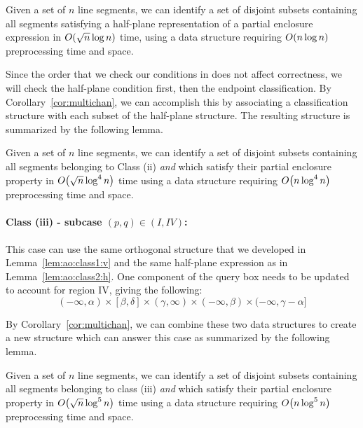 \begin{lemma}
\label{lem:ao:class2:h}
Given a set of $n$ line segments, we can identify a set of disjoint subsets 
containing all segments satisfying a half-plane representation of a partial 
enclosure expression in $O\!\left(\sqrt{n}\log{n}\right)$ time, using a data structure 
requiring $O\!\left(n\log{n}\right)$ preprocessing time and space.
\end{lemma}

Since the order that we check our conditions in does not affect correctness, we 
will check the half-plane condition first, then the endpoint classification.  
By Corollary~\ref{cor:multichan}, we can accomplish this by associating a 
classification structure with each subset of the half-plane structure. The 
resulting structure is summarized by the following lemma.

\begin{lemma}
\label{lem:ao:class2:c}
Given a set of $n$ line segments, we can identify a set of disjoint subsets 
containing all segments belonging to Class (ii) \emph{and} which satisfy their 
partial enclosure property in $O\!\left(\sqrt{n}\log^4{n}\right)$ time using a data 
structure requiring $O\!\left(n\log^4{n}\right)$ preprocessing time and space.
\end{lemma}


\paragraph{Class (iii) - subcase $(p, q) \in (I, IV)$:} 
This case can use the same orthogonal structure that we developed in 
Lemma~\ref{lem:ao:class1:v} and the same half-plane expression as in 
Lemma~\ref{lem:ao:class2:h}. 
One component of the query box needs to be updated to account for region IV, 
giving the following:
\[
(-\infty, \alpha) \times [\beta, \delta] \times (\gamma, \infty) \times 
(-\infty, \beta) \times (-\infty, \gamma - \alpha]
\]

By Corollary~\ref{cor:multichan}, we can combine these two data structures to 
create a new structure which can answer this case as summarized by the following 
lemma.

\begin{lemma}
\label{lem:ao:class3:c}
Given a set of $n$ line segments, we can identify a set of disjoint subsets 
containing all segments belonging to class (iii) \emph{and} which satisfy their 
partial enclosure property in $O\!\left(\sqrt{n}\log^5{n}\right)$ time using a data 
structure requiring $O\!\left(n\log^5{n}\right)$ preprocessing time and space.
\end{lemma}


